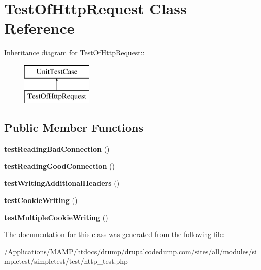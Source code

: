 \hypertarget{class_test_of_http_request}{
\section{TestOfHttpRequest Class Reference}
\label{class_test_of_http_request}
}
Inheritance diagram for TestOfHttpRequest::\begin{figure}[H]
\begin{center}
\leavevmode
\includegraphics[height=2cm]{class_test_of_http_request}
\end{center}
\end{figure}
\subsection*{Public Member Functions}
\begin{DoxyCompactItemize}
\item 
\hypertarget{class_test_of_http_request_a5107e9b7312854428fcca690df875165}{
{\bfseries testReadingBadConnection} ()}
\label{class_test_of_http_request_a5107e9b7312854428fcca690df875165}

\item 
\hypertarget{class_test_of_http_request_ae03ab34d659ad6dc2b635ee360ac37c3}{
{\bfseries testReadingGoodConnection} ()}
\label{class_test_of_http_request_ae03ab34d659ad6dc2b635ee360ac37c3}

\item 
\hypertarget{class_test_of_http_request_a7c510bc08e9286e0da3e6e989ee1920e}{
{\bfseries testWritingAdditionalHeaders} ()}
\label{class_test_of_http_request_a7c510bc08e9286e0da3e6e989ee1920e}

\item 
\hypertarget{class_test_of_http_request_a7c98326de9720f7dc142136b31227072}{
{\bfseries testCookieWriting} ()}
\label{class_test_of_http_request_a7c98326de9720f7dc142136b31227072}

\item 
\hypertarget{class_test_of_http_request_a1f39a75652a28f9be3d462ba716e8913}{
{\bfseries testMultipleCookieWriting} ()}
\label{class_test_of_http_request_a1f39a75652a28f9be3d462ba716e8913}

\end{DoxyCompactItemize}


The documentation for this class was generated from the following file:\begin{DoxyCompactItemize}
\item 
/Applications/MAMP/htdocs/drump/drupalcodedump.com/sites/all/modules/simpletest/simpletest/test/http\_\-test.php\end{DoxyCompactItemize}
